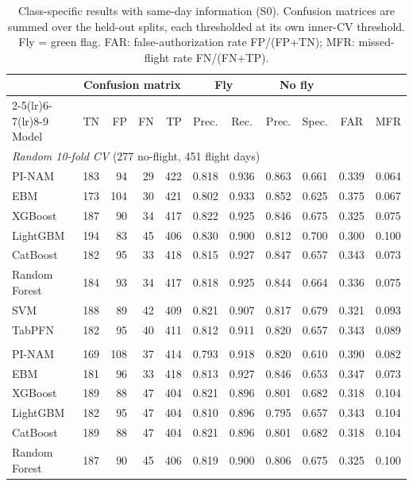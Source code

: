 \begin{table}[!ht]
\centering\small
\caption{Class-specific results with same-day information (S0). Confusion matrices are summed over the held-out splits, each thresholded at its own inner-CV threshold. Fly = green flag. FAR: false-authorization rate FP/(FP+TN); MFR: missed-flight rate FN/(FN+TP).}
\label{tab:class_metrics}
\begin{tabular}{lrrrrcccccc}
\toprule
 & \multicolumn{4}{c}{Confusion matrix} & \multicolumn{2}{c}{Fly} & \multicolumn{2}{c}{No fly} & & \\
\cmidrule(lr){2-5}\cmidrule(lr){6-7}\cmidrule(lr){8-9}
Model & TN & FP & FN & TP & Prec. & Rec. & Prec. & Spec. & FAR & MFR \\
\midrule
\multicolumn{11}{l}{\textit{Random 10-fold CV} (277 no-flight, 451 flight days)} \\
PI-NAM & 183 & 94 & 29 & 422 & 0.818 & 0.936 & 0.863 & 0.661 & 0.339 & 0.064 \\
EBM & 173 & 104 & 30 & 421 & 0.802 & 0.933 & 0.852 & 0.625 & 0.375 & 0.067 \\
XGBoost & 187 & 90 & 34 & 417 & 0.822 & 0.925 & 0.846 & 0.675 & 0.325 & 0.075 \\
LightGBM & 194 & 83 & 45 & 406 & 0.830 & 0.900 & 0.812 & 0.700 & 0.300 & 0.100 \\
CatBoost & 182 & 95 & 33 & 418 & 0.815 & 0.927 & 0.847 & 0.657 & 0.343 & 0.073 \\
Random Forest & 184 & 93 & 34 & 417 & 0.818 & 0.925 & 0.844 & 0.664 & 0.336 & 0.075 \\
SVM & 188 & 89 & 42 & 409 & 0.821 & 0.907 & 0.817 & 0.679 & 0.321 & 0.093 \\
TabPFN & 182 & 95 & 40 & 411 & 0.812 & 0.911 & 0.820 & 0.657 & 0.343 & 0.089 \\
\addlinespace
\multicolumn{11}{l}{\textit{Blocked CV} (277 no-flight, 451 flight days)} \\
PI-NAM & 169 & 108 & 37 & 414 & 0.793 & 0.918 & 0.820 & 0.610 & 0.390 & 0.082 \\
EBM & 181 & 96 & 33 & 418 & 0.813 & 0.927 & 0.846 & 0.653 & 0.347 & 0.073 \\
XGBoost & 189 & 88 & 47 & 404 & 0.821 & 0.896 & 0.801 & 0.682 & 0.318 & 0.104 \\
LightGBM & 182 & 95 & 47 & 404 & 0.810 & 0.896 & 0.795 & 0.657 & 0.343 & 0.104 \\
CatBoost & 189 & 88 & 47 & 404 & 0.821 & 0.896 & 0.801 & 0.682 & 0.318 & 0.104 \\
Random Forest & 187 & 90 & 45 & 406 & 0.819 & 0.900 & 0.806 & 0.675 & 0.325 & 0.100 \\

\end{tabular}
\end{table}
